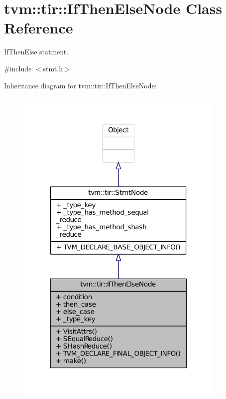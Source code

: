 \hypertarget{classtvm_1_1tir_1_1IfThenElseNode}{}\section{tvm\+:\+:tir\+:\+:If\+Then\+Else\+Node Class Reference}
\label{classtvm_1_1tir_1_1IfThenElseNode}


If\+Then\+Else statment.  




{\ttfamily \#include $<$stmt.\+h$>$}



Inheritance diagram for tvm\+:\+:tir\+:\+:If\+Then\+Else\+Node\+:
\nopagebreak
\begin{figure}[H]
\begin{center}
\leavevmode
\includegraphics[width=285pt]{classtvm_1_1tir_1_1IfThenElseNode__inherit__graph}
\end{center}
\end{figure}


